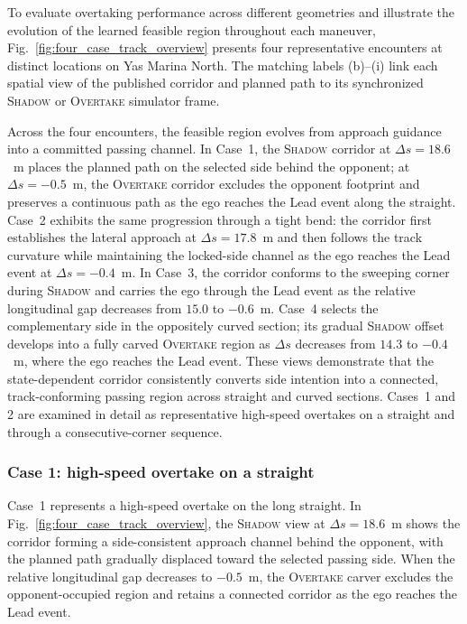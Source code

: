 \documentclass[journal,twoside,web]{ieeecolor}
\begin{document}
To evaluate overtaking performance across different geometries and illustrate
the evolution of the learned feasible region throughout each maneuver,
Fig.~\ref{fig:four_case_track_overview} presents four representative
encounters at distinct locations on Yas Marina North. The matching labels
(b)--(i) link each spatial view of the published corridor and planned path to
its synchronized \textsc{Shadow} or \textsc{Overtake} simulator frame. 



Across the four encounters, the feasible region evolves from approach guidance into a
committed passing channel. In Case~1, the \textsc{Shadow} corridor at
$\Delta s=18.6$~m places the planned path on the selected side behind the
opponent; at $\Delta s=-0.5$~m, the \textsc{Overtake} corridor excludes the
opponent footprint and preserves a continuous path as the ego reaches the Lead
event along the straight. Case~2
exhibits the same progression through a tight bend: the corridor first
establishes the lateral approach at $\Delta s=17.8$~m and then follows the
track curvature while maintaining the locked-side channel as the ego reaches
the Lead event at $\Delta s=-0.4$~m. In Case~3, the corridor conforms to the sweeping corner
during \textsc{Shadow} and carries the ego through the Lead event as the
relative longitudinal gap decreases from $15.0$ to $-0.6$~m. Case~4 selects the
complementary side in the oppositely curved section; its gradual
\textsc{Shadow} offset develops into a fully carved \textsc{Overtake} region
as $\Delta s$ decreases from $14.3$ to $-0.4$~m, where the ego reaches the
Lead event. These views demonstrate that
the state-dependent corridor consistently converts side intention into a
connected, track-conforming passing region across straight and curved
sections. Cases~1 and 2 are examined in detail as representative high-speed
overtakes on a straight and through a consecutive-corner sequence.

\subsubsection*{Case 1: high-speed overtake on a straight}

Case~1 represents a high-speed overtake on the long straight. In
Fig.~\ref{fig:four_case_track_overview}, the \textsc{Shadow} view at
$\Delta s=18.6$~m shows the corridor forming a side-consistent approach
channel behind the opponent, with the planned path gradually displaced toward
the selected passing side. When the relative longitudinal gap decreases to
$-0.5$~m, the \textsc{Overtake} carver excludes the opponent-occupied region
and retains a connected corridor as the ego reaches the Lead event.
\end{document}
